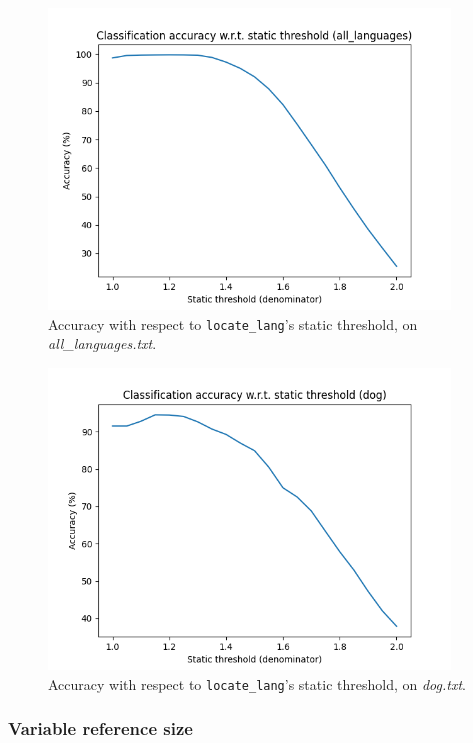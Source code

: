 \documentclass{article}
\begin{document}
\begin{figure}
    \centering
    \includegraphics[width=0.95\textwidth]{../results/all_languages/ll-s.png}
    \caption{Accuracy with respect to \texttt{locate\_lang}'s static threshold, on \textit{all\_languages.txt}.}
    \label{fig:ll_s_all_languages}
\end{figure}

\begin{figure}
    \centering
    \includegraphics[width=0.95\textwidth]{../results/dog/ll-s.png}
    \caption{Accuracy with respect to \texttt{locate\_lang}'s static threshold, on \textit{dog.txt}.}
    \label{fig:ll_s_dog}
\end{figure}

\subsubsection{Variable reference size}
\label{subsubsec:results_locate_lang_variable_reference_size}
\end{document}
